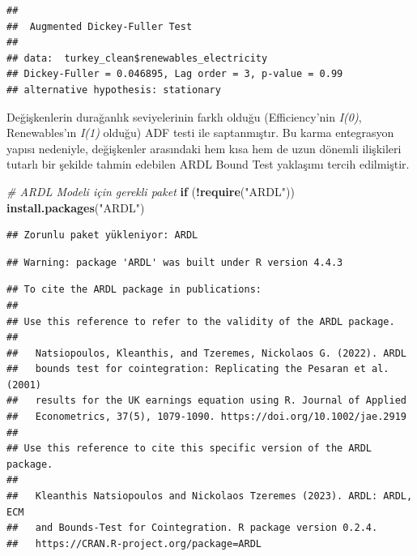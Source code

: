 \documentclass[
]{article}
\newenvironment{Shaded}{\begin{snugshade}}{\end{snugshade}}
\newcommand{\CommentTok}[1]{\textcolor[rgb]{0.56,0.35,0.01}{\textit{#1}}}
\newcommand{\ControlFlowTok}[1]{\textcolor[rgb]{0.13,0.29,0.53}{\textbf{#1}}}
\newcommand{\FunctionTok}[1]{\textcolor[rgb]{0.13,0.29,0.53}{\textbf{#1}}}
\newcommand{\NormalTok}[1]{#1}
\newcommand{\SpecialCharTok}[1]{\textcolor[rgb]{0.81,0.36,0.00}{\textbf{#1}}}
\newcommand{\StringTok}[1]{\textcolor[rgb]{0.31,0.60,0.02}{#1}}
\begin{document}
\begin{verbatim}
## 
##  Augmented Dickey-Fuller Test
## 
## data:  turkey_clean$renewables_electricity
## Dickey-Fuller = 0.046895, Lag order = 3, p-value = 0.99
## alternative hypothesis: stationary
\end{verbatim}

Değişkenlerin durağanlık seviyelerinin farklı olduğu (Efficiency'nin
\emph{I(0)}, Renewables'ın \emph{I(1)} olduğu) ADF testi ile
saptanmıştır. Bu karma entegrasyon yapısı nedeniyle, değişkenler
arasındaki hem kısa hem de uzun dönemli ilişkileri tutarlı bir şekilde
tahmin edebilen ARDL Bound Test yaklaşımı tercih edilmiştir.

\begin{Shaded}
\begin{Highlighting}[]
\CommentTok{\# ARDL Modeli için gerekli paket}
\ControlFlowTok{if}\NormalTok{ (}\SpecialCharTok{!}\FunctionTok{require}\NormalTok{(}\StringTok{"ARDL"}\NormalTok{)) }\FunctionTok{install.packages}\NormalTok{(}\StringTok{"ARDL"}\NormalTok{)}
\end{Highlighting}
\end{Shaded}

\begin{verbatim}
## Zorunlu paket yükleniyor: ARDL
\end{verbatim}

\begin{verbatim}
## Warning: package 'ARDL' was built under R version 4.4.3
\end{verbatim}

\begin{verbatim}
## To cite the ARDL package in publications:
## 
## Use this reference to refer to the validity of the ARDL package.
## 
##   Natsiopoulos, Kleanthis, and Tzeremes, Nickolaos G. (2022). ARDL
##   bounds test for cointegration: Replicating the Pesaran et al. (2001)
##   results for the UK earnings equation using R. Journal of Applied
##   Econometrics, 37(5), 1079-1090. https://doi.org/10.1002/jae.2919
## 
## Use this reference to cite this specific version of the ARDL package.
## 
##   Kleanthis Natsiopoulos and Nickolaos Tzeremes (2023). ARDL: ARDL, ECM
##   and Bounds-Test for Cointegration. R package version 0.2.4.
##   https://CRAN.R-project.org/package=ARDL
\end{verbatim}
\end{document}
